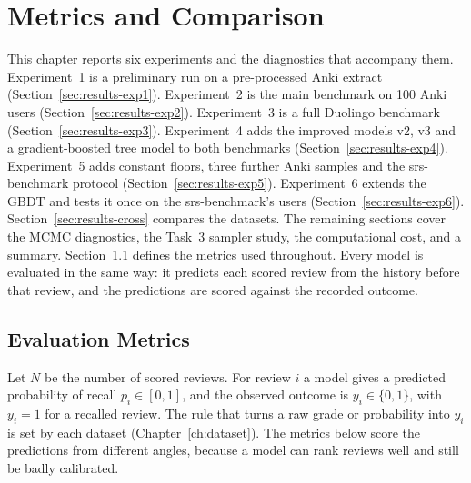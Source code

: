 \chapter{Metrics and Comparison}
\label{ch:results}

This chapter reports six experiments and the diagnostics that accompany them. Experiment~1 is a
preliminary run on a pre-processed Anki extract (Section~\ref{sec:results-exp1}). Experiment~2 is the
main benchmark on 100 Anki users (Section~\ref{sec:results-exp2}). Experiment~3 is a full Duolingo
benchmark (Section~\ref{sec:results-exp3}). Experiment~4 adds the improved models v2, v3 and a gradient-boosted tree model to both benchmarks
(Section~\ref{sec:results-exp4}). Experiment~5 adds constant floors, three further Anki samples and the srs-benchmark protocol
(Section~\ref{sec:results-exp5}). Experiment~6 extends the GBDT and tests it once on the srs-benchmark's users (Section~\ref{sec:results-exp6}). Section~\ref{sec:results-cross} compares the datasets. The remaining sections cover the MCMC diagnostics, the Task~3 sampler study, the
computational cost, and a summary. Section~\ref{sec:results-metrics} defines the metrics used
throughout. Every model is evaluated in the same way: it predicts each scored review from the
history before that review, and the predictions are scored against the recorded outcome.

\section{Evaluation Metrics}
\label{sec:results-metrics}

Let $N$ be the number of scored reviews. For review $i$ a model gives a predicted probability of
recall $p_i \in [0,1]$, and the observed outcome is $y_i \in \{0,1\}$, with $y_i = 1$ for a recalled
review. The rule that turns a raw grade or probability into $y_i$ is set by each dataset
(Chapter~\ref{ch:dataset}). The metrics below score the predictions from different angles, because a
model can rank reviews well and still be badly calibrated.

